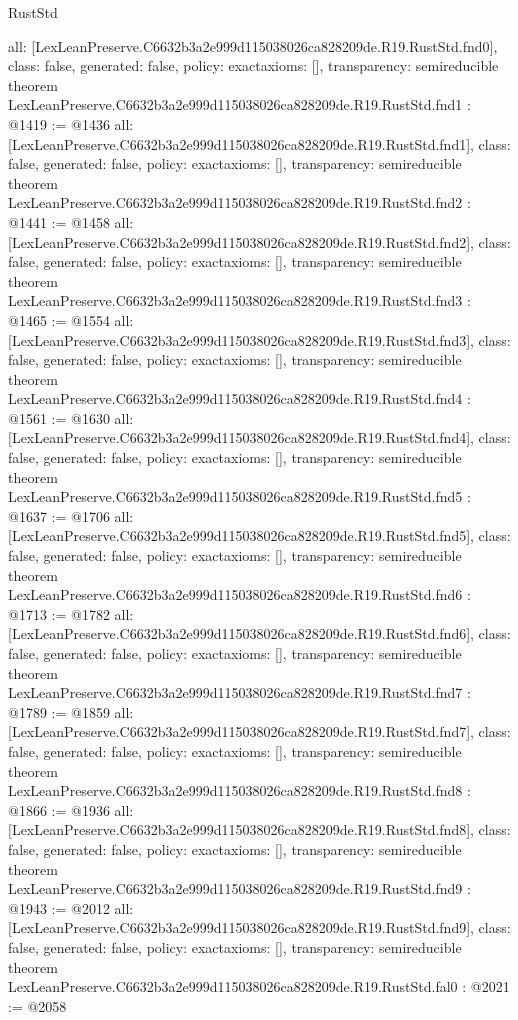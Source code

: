 \begin{lexlean}{RustStd}
\begin{coremodule}
{  all: [LexLeanPreserve.C6632b3a2e999d115038026ca828209de.R19.RustStd.fnd0],
  class: false,
  generated: false,
  policy: exact{axioms: []},
  transparency: semireducible
}
theorem LexLeanPreserve.C6632b3a2e999d115038026ca828209de.R19.RustStd.fnd1 : @1419 := @1436 {
  all: [LexLeanPreserve.C6632b3a2e999d115038026ca828209de.R19.RustStd.fnd1],
  class: false,
  generated: false,
  policy: exact{axioms: []},
  transparency: semireducible
}
theorem LexLeanPreserve.C6632b3a2e999d115038026ca828209de.R19.RustStd.fnd2 : @1441 := @1458 {
  all: [LexLeanPreserve.C6632b3a2e999d115038026ca828209de.R19.RustStd.fnd2],
  class: false,
  generated: false,
  policy: exact{axioms: []},
  transparency: semireducible
}
theorem LexLeanPreserve.C6632b3a2e999d115038026ca828209de.R19.RustStd.fnd3 : @1465 := @1554 {
  all: [LexLeanPreserve.C6632b3a2e999d115038026ca828209de.R19.RustStd.fnd3],
  class: false,
  generated: false,
  policy: exact{axioms: []},
  transparency: semireducible
}
theorem LexLeanPreserve.C6632b3a2e999d115038026ca828209de.R19.RustStd.fnd4 : @1561 := @1630 {
  all: [LexLeanPreserve.C6632b3a2e999d115038026ca828209de.R19.RustStd.fnd4],
  class: false,
  generated: false,
  policy: exact{axioms: []},
  transparency: semireducible
}
theorem LexLeanPreserve.C6632b3a2e999d115038026ca828209de.R19.RustStd.fnd5 : @1637 := @1706 {
  all: [LexLeanPreserve.C6632b3a2e999d115038026ca828209de.R19.RustStd.fnd5],
  class: false,
  generated: false,
  policy: exact{axioms: []},
  transparency: semireducible
}
theorem LexLeanPreserve.C6632b3a2e999d115038026ca828209de.R19.RustStd.fnd6 : @1713 := @1782 {
  all: [LexLeanPreserve.C6632b3a2e999d115038026ca828209de.R19.RustStd.fnd6],
  class: false,
  generated: false,
  policy: exact{axioms: []},
  transparency: semireducible
}
theorem LexLeanPreserve.C6632b3a2e999d115038026ca828209de.R19.RustStd.fnd7 : @1789 := @1859 {
  all: [LexLeanPreserve.C6632b3a2e999d115038026ca828209de.R19.RustStd.fnd7],
  class: false,
  generated: false,
  policy: exact{axioms: []},
  transparency: semireducible
}
theorem LexLeanPreserve.C6632b3a2e999d115038026ca828209de.R19.RustStd.fnd8 : @1866 := @1936 {
  all: [LexLeanPreserve.C6632b3a2e999d115038026ca828209de.R19.RustStd.fnd8],
  class: false,
  generated: false,
  policy: exact{axioms: []},
  transparency: semireducible
}
theorem LexLeanPreserve.C6632b3a2e999d115038026ca828209de.R19.RustStd.fnd9 : @1943 := @2012 {
  all: [LexLeanPreserve.C6632b3a2e999d115038026ca828209de.R19.RustStd.fnd9],
  class: false,
  generated: false,
  policy: exact{axioms: []},
  transparency: semireducible
}
theorem LexLeanPreserve.C6632b3a2e999d115038026ca828209de.R19.RustStd.fal0 : @2021 := @2058 {
}
\end{coremodule}
\end{lexlean}
